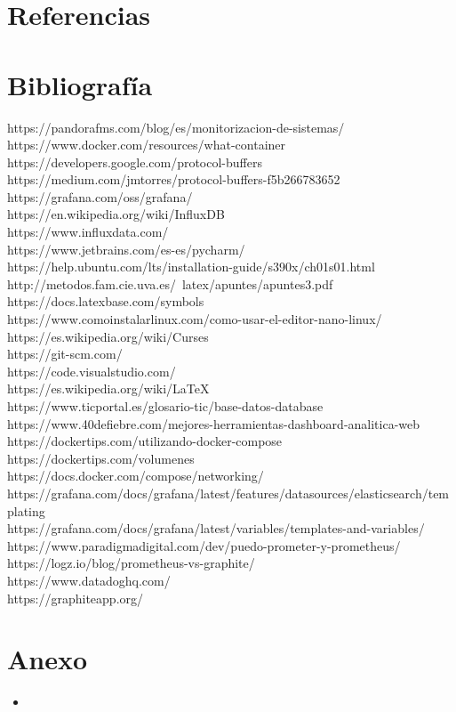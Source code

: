 \documentclass[ spanish, a4paper, 12pt, oneside]{report}
\begin{document}
\chapter{Referencias}

\chapter{Bibliografía}
https://pandorafms.com/blog/es/monitorizacion-de-sistemas/ \\
https://www.docker.com/resources/what-container \\
https://developers.google.com/protocol-buffers \\
https://medium.com/jmtorres/protocol-buffers-f5b266783652 \\
https://grafana.com/oss/grafana/ \\
https://en.wikipedia.org/wiki/InfluxDB \\
https://www.influxdata.com/ \\
https://www.jetbrains.com/es-es/pycharm/ \\
https://help.ubuntu.com/lts/installation-guide/s390x/ch01s01.html \\
http://metodos.fam.cie.uva.es/~latex/apuntes/apuntes3.pdf \\
https://docs.latexbase.com/symbols \\
https://www.comoinstalarlinux.com/como-usar-el-editor-nano-linux/\\
https://es.wikipedia.org/wiki/Curses \\
https://git-scm.com/ \\
https://code.visualstudio.com/ \\
https://es.wikipedia.org/wiki/LaTeX \\
https://www.ticportal.es/glosario-tic/base-datos-database \\
https://www.40defiebre.com/mejores-herramientas-dashboard-analitica-web \\
https://dockertips.com/utilizando-docker-compose \\
https://dockertips.com/volumenes \\
https://docs.docker.com/compose/networking/ \\
https://grafana.com/docs/grafana/latest/features/datasources/elasticsearch/templating \\
https://grafana.com/docs/grafana/latest/variables/templates-and-variables/ \\
https://www.paradigmadigital.com/dev/puedo-prometer-y-prometheus/ \\
https://logz.io/blog/prometheus-vs-graphite/ \\
https://www.datadoghq.com/ \\
https://graphiteapp.org/ \\

\chapter{Anexo}

\begin{itemize}
   \item 
\end{itemize}
\end{document}
